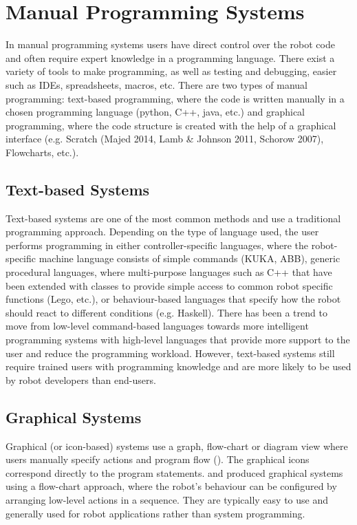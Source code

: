 \section{Manual Programming Systems}\label{subsec:Manual Programming Systems}
In manual programming systems users have direct control over the robot code
and often require expert knowledge in a programming language. %
There exist a variety of tools to make programming, as well as testing and debugging, easier such as IDEs, spreadsheets, macros, etc.
There are two types of manual programming: text-based programming, where the code is written manually in a chosen programming language (python, C++, java, etc.) and graphical programming, where the code structure is created with the help of a graphical interface (e.g. Scratch (Majed 2014, Lamb \& Johnson 2011, Schorow 2007), Flowcharts, etc.). 

\subsection{Text-based Systems}\label{sssec:Text-based Systems}
Text-based systems are one of the most common methods and use a traditional programming approach. 
Depending on the type of language used, the user performs programming in either controller-specific languages, where the robot-specific machine language consists of simple commands ({KUKA, ABB}), generic procedural languages, where multi-purpose languages such as C++ that have been extended with classes to provide simple access to common robot specific functions ({Lego, etc.}), or behaviour-based languages that specify how the robot should react to different conditions (e.g. Haskell). 
There has been a trend to move from low-level command-based languages towards more intelligent programming systems with high-level languages that provide more support to the user and reduce the programming workload.
However, text-based systems still require trained users with programming knowledge and are more likely to be used by robot developers than end-users.



\subsection{Graphical Systems}\label{sssec:Graphical systems}
Graphical (or icon-based) systems use a graph, flow-chart or diagram view where users manually specify actions and program flow ().
The graphical icons correspond directly to the program statements.
\cite{lego2003} and \cite{bischoff2002morpha} produced graphical systems using a flow-chart approach, where the robot's behaviour can be configured by arranging low-level actions in a sequence.
They are typically easy to use and generally used for robot applications rather than system programming. 

